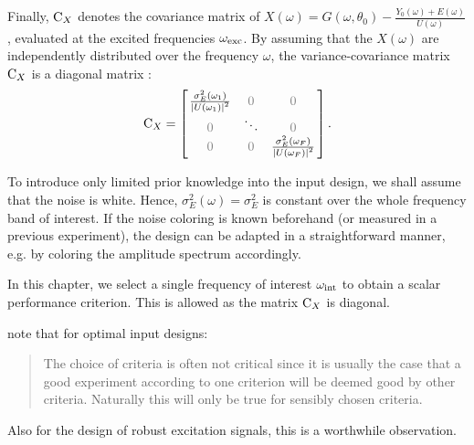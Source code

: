   Finally, $\mathrm{C}_{X}$ denotes the covariance matrix of $X\left(\omega\right) = G\left(\omega, \theta_0 \right) - \frac{Y_0\left(\omega \right) + E\left( \omega \right)  }{ U\left( \omega \right) } $, evaluated at the excited frequencies $\omega_{\mathrm{exc}}$.
  By assuming that the $X\left( \omega \right) $ are independently distributed over the frequency $\omega$, the variance-covariance matrix $\mathrm{C}_{X}$ is a diagonal matrix \citep{Pintelon2012}:
  \begin{equation}
    \C_{X} =
               \left[ \left.
               \begin{matrix}
                 \frac{\sigma^2_E\left(\omega_1 \right) }
                      {\abs{ U\left(\omega_1 \right)}^2 } & \deemph{0} & \deemph{0}\\
                 \deemph{0} & \ddots & \deemph{0} \\
                 \deemph{0} & \deemph{0} & \frac{\sigma^2_E\left(\omega_F \right) }
                              {\abs{U\left(\omega_F \right)}^2 }
               \end{matrix}
               \right.^{\vphantom{x}}\right]
    \text{.}
  \end{equation}
  \begin{remark}
  To introduce only limited prior knowledge into the input design, we shall assume that the noise is white.
  Hence, $\sigma^2_E(\omega) = \sigma^2_E$ is constant over the whole frequency band of interest.
  If the noise coloring is known beforehand (or measured in a previous experiment), the design can be adapted in a straightforward manner, e.g. by coloring the amplitude spectrum accordingly.
  \end{remark}

  In this chapter, we select a single frequency of interest $\omega_{\mathrm{int}}$ to obtain a scalar performance criterion.
  This is allowed as the matrix $\mathrm{C}_{X}$ is diagonal.

\begin{remark}
\citet{Goodwin1977} note that for optimal input designs:
\begin{quote}
The choice of criteria is often not critical since it is usually the case that a good experiment according to one criterion will be deemed good by other criteria. 
Naturally this will only be true for sensibly chosen criteria.
\end{quote}
Also for the design of robust excitation signals, this is a worthwhile observation.
\end{remark}


